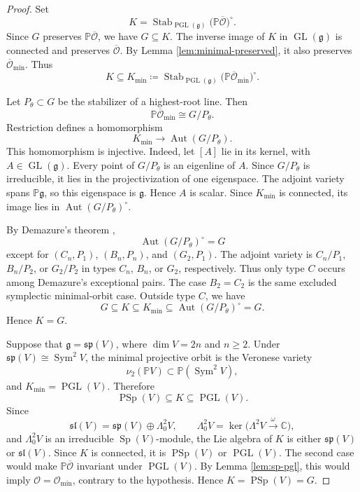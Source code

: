 \documentclass[12pt]{article}
\theoremstyle{remark}
\theoremstyle{plain}
\DeclareMathOperator{\Sym}{Sym}
\newcommand{\C}{\mathbb C}
\begin{document}
\begin{proof}
Set
\[
K=
\operatorname{Stab}_{\operatorname{PGL}(\mathfrak g)}
\bigl(\mathbb P\overline{\mathcal O}\bigr)^\circ.
\]
Since $G$ preserves $\mathbb P\overline{\mathcal O}$, we have
$G\subseteq K$. The inverse image of $K$ in
$\operatorname{GL}(\mathfrak g)$ is connected and preserves
$\overline{\mathcal O}$. By Lemma \ref{lem:minimal-preserved}, it also
preserves $\overline{\mathcal O}_{\min}$. Thus
\[
K\subseteq
K_{\min}\coloneqq
\operatorname{Stab}_{\operatorname{PGL}(\mathfrak g)}
\bigl(\mathbb P\overline{\mathcal O}_{\min}\bigr)^\circ.
\]

Let $P_\theta\subset G$ be the stabilizer of a highest-root line. Then
\[
\mathbb P\overline{\mathcal O}_{\min}\cong G/P_\theta.
\]
Restriction defines a homomorphism
\[
K_{\min}\longrightarrow\operatorname{Aut}(G/P_\theta).
\]
This homomorphism is injective. Indeed, let $[A]$ lie in its kernel,
with $A\in\operatorname{GL}(\mathfrak g)$. Every point of
$G/P_\theta$ is an eigenline of $A$. Since $G/P_\theta$ is
irreducible, it lies in the projectivization of one eigenspace. The
adjoint variety spans $\mathbb P\mathfrak g$, so this eigenspace is
$\mathfrak g$. Hence $A$ is scalar. Since $K_{\min}$ is connected,
its image lies in $\operatorname{Aut}(G/P_\theta)^\circ$.

By Demazure's theorem
\cite[pp.~181--182, Th\'eor\`eme~1]{Demazure},
\[
\operatorname{Aut}(G/P_\theta)^\circ=G
\]
except for $(C_n,P_1)$, $(B_n,P_n)$, and $(G_2,P_1)$. The adjoint
variety is $C_n/P_1$, $B_n/P_2$, or $G_2/P_2$ in types $C_n$, $B_n$,
or $G_2$, respectively. Thus only type $C$ occurs among Demazure's
exceptional pairs. The case $B_2=C_2$ is the same excluded
symplectic minimal-orbit case. Outside type $C$, we have
\[
G\subseteq K\subseteq K_{\min}\subseteq
\operatorname{Aut}(G/P_\theta)^\circ=G.
\]
Hence $K=G$.

Suppose that $\mathfrak g=\mathfrak{sp}(V)$, where $\dim V=2n$ and
$n\geq2$. Under $\mathfrak{sp}(V)\cong\Sym^2V$, the minimal
projective orbit is the Veronese variety
\[
\nu_2(\mathbb P V)\subset\mathbb P(\Sym^2V),
\]
and $K_{\min}=\operatorname{PGL}(V)$. Therefore
\[
\operatorname{PSp}(V)\subseteq K\subseteq\operatorname{PGL}(V).
\]
Since
\[
\mathfrak{sl}(V)=\mathfrak{sp}(V)\oplus\Lambda^2_0V,
\qquad
\Lambda^2_0V=\ker\bigl(\Lambda^2V\xrightarrow{\,\omega\,}\C\bigr),
\]
and $\Lambda^2_0V$ is an irreducible $\operatorname{Sp}(V)$-module,
the Lie algebra of $K$ is either $\mathfrak{sp}(V)$ or
$\mathfrak{sl}(V)$. Since $K$ is connected, it is
$\operatorname{PSp}(V)$ or $\operatorname{PGL}(V)$. The second case
would make $\mathbb P\overline{\mathcal O}$ invariant under
$\operatorname{PGL}(V)$. By Lemma \ref{lem:sp-pgl}, this would imply
$\mathcal O=\mathcal O_{\min}$, contrary to the hypothesis. Hence
$K=\operatorname{PSp}(V)=G$.
\end{proof}
\end{document}

